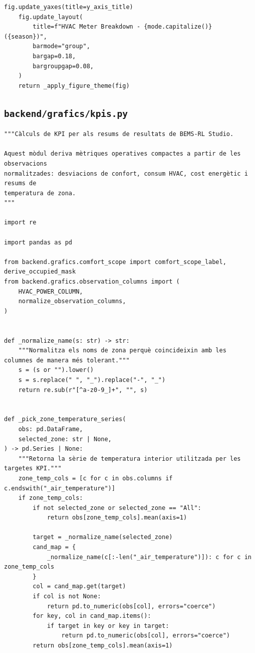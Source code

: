 \documentclass[10pt,a4paper]{article}
\begin{document}
\begin{lstlisting}[style=studioPython,caption={backend/grafics/hvac.py},label={lst:backend-grafics-hvac-py}]
    fig.update_yaxes(title=y_axis_title)
    fig.update_layout(
        title=f"HVAC Meter Breakdown - {mode.capitalize()} ({season})",
        barmode="group",
        bargap=0.18,
        bargroupgap=0.08,
    )
    return _apply_figure_theme(fig)
\end{lstlisting}


\subsection{\texorpdfstring{\texttt{backend/grafics/kpis.py}}{backend/grafics/kpis.py}}

\begin{lstlisting}[style=studioPython,caption={backend/grafics/kpis.py},label={lst:backend-grafics-kpis-py}]
"""Càlculs de KPI per als resums de resultats de BEMS-RL Studio.

Aquest mòdul deriva mètriques operatives compactes a partir de les observacions
normalitzades: desviacions de confort, consum HVAC, cost energètic i resums de
temperatura de zona.
"""

import re

import pandas as pd

from backend.grafics.comfort_scope import comfort_scope_label, derive_occupied_mask
from backend.grafics.observation_columns import (
    HVAC_POWER_COLUMN,
    normalize_observation_columns,
)


def _normalize_name(s: str) -> str:
    """Normalitza els noms de zona perquè coincideixin amb les columnes de manera més tolerant."""
    s = (s or "").lower()
    s = s.replace(" ", "_").replace("-", "_")
    return re.sub(r"[^a-z0-9_]+", "", s)


def _pick_zone_temperature_series(
    obs: pd.DataFrame,
    selected_zone: str | None,
) -> pd.Series | None:
    """Retorna la sèrie de temperatura interior utilitzada per les targetes KPI."""
    zone_temp_cols = [c for c in obs.columns if c.endswith("_air_temperature")]
    if zone_temp_cols:
        if not selected_zone or selected_zone == "All":
            return obs[zone_temp_cols].mean(axis=1)

        target = _normalize_name(selected_zone)
        cand_map = {
            _normalize_name(c[:-len("_air_temperature")]): c for c in zone_temp_cols
        }
        col = cand_map.get(target)
        if col is not None:
            return pd.to_numeric(obs[col], errors="coerce")
        for key, col in cand_map.items():
            if target in key or key in target:
                return pd.to_numeric(obs[col], errors="coerce")
        return obs[zone_temp_cols].mean(axis=1)


\end{lstlisting}
\end{document}
